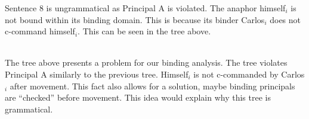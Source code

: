 \documentclass[20pt]{article}
\newcommand{\feature}[1]{\ensuremath{\left[ \text{#1} \right]}}
\newcommand{\treeScale}[0]{0.8}
\begin{document}
Sentence 8 is ungrammatical as Principal A is violated. The anaphor himself$_i$
is not bound within its binding domain. This is because its binder Carlos$_i$
does not c-command himself$_i$. This can be seen in the tree above.

 \\

The tree above presents a problem for our binding analysis. The tree violates
Principal A similarly to the previous tree. Himself$_i$ is not c-commanded by
Carlos$_i$ after movement. This fact also allows for a solution, maybe binding
principals are ``checked'' before movement. This idea would explain why this
tree is grammatical. \\
\end{document}
